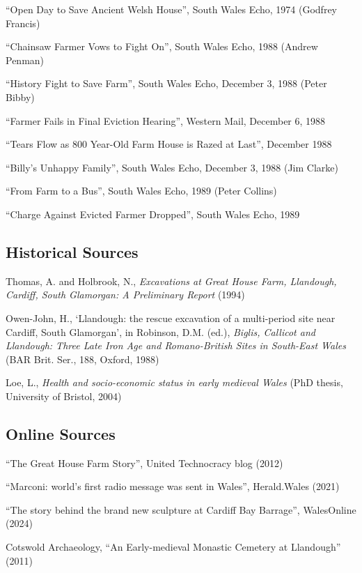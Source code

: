 \documentclass[11pt,a4paper]{article}
\begin{document}
\begin{enumerate}[label={[\arabic*]}]
    \item ``Open Day to Save Ancient Welsh House'', South Wales Echo, 1974 (Godfrey Francis)
    \item ``Chainsaw Farmer Vows to Fight On'', South Wales Echo, 1988 (Andrew Penman)
    \item ``History Fight to Save Farm'', South Wales Echo, December 3, 1988 (Peter Bibby)
    \item ``Farmer Fails in Final Eviction Hearing'', Western Mail, December 6, 1988
    \item ``Tears Flow as 800 Year-Old Farm House is Razed at Last'', December 1988
    \item ``Billy's Unhappy Family'', South Wales Echo, December 3, 1988 (Jim Clarke)
    \item ``From Farm to a Bus'', South Wales Echo, 1989 (Peter Collins)
    \item ``Charge Against Evicted Farmer Dropped'', South Wales Echo, 1989
\end{enumerate}

\subsection{Historical Sources}

\begin{enumerate}[label={[\arabic*]}]
    \item Thomas, A. and Holbrook, N., \textit{Excavations at Great House Farm, Llandough, Cardiff, South Glamorgan: A Preliminary Report} (1994)
    \item Owen-John, H., `Llandough: the rescue excavation of a multi-period site near Cardiff, South Glamorgan', in Robinson, D.M. (ed.), \textit{Biglis, Callicot and Llandough: Three Late Iron Age and Romano-British Sites in South-East Wales} (BAR Brit. Ser., 188, Oxford, 1988)
    \item Loe, L., \textit{Health and socio-economic status in early medieval Wales} (PhD thesis, University of Bristol, 2004)
\end{enumerate}

\subsection{Online Sources}

\begin{enumerate}[label={[\arabic*]}]
    \item ``The Great House Farm Story'', United Technocracy blog (2012)
    \item ``Marconi: world's first radio message was sent in Wales'', Herald.Wales (2021)
    \item ``The story behind the brand new sculpture at Cardiff Bay Barrage'', WalesOnline (2024)
    \item Cotswold Archaeology, ``An Early-medieval Monastic Cemetery at Llandough'' (2011)
\end{enumerate}
\end{document}
